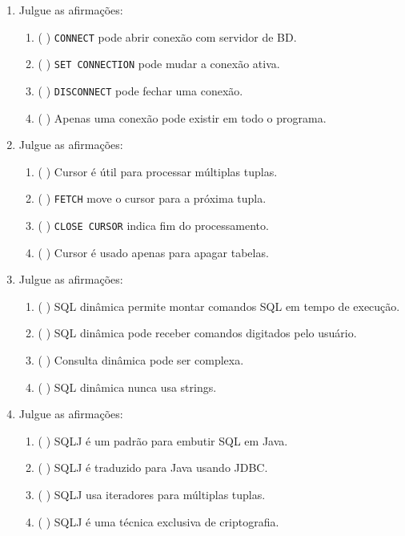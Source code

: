 \documentclass[12pt,a4paper]{article}
\begin{document}
\begin{enumerate}[resume,label=\textbf{Q\arabic*.}]
\item Julgue as afirmações:

\begin{enumerate}[label=\alph*)]
    \item ( \quad ) \texttt{CONNECT} pode abrir conexão com servidor de BD.
    \item ( \quad ) \texttt{SET CONNECTION} pode mudar a conexão ativa.
    \item ( \quad ) \texttt{DISCONNECT} pode fechar uma conexão.
    \item ( \quad ) Apenas uma conexão pode existir em todo o programa.
\end{enumerate}

\item Julgue as afirmações:

\begin{enumerate}[label=\alph*)]
    \item ( \quad ) Cursor é útil para processar múltiplas tuplas.
    \item ( \quad ) \texttt{FETCH} move o cursor para a próxima tupla.
    \item ( \quad ) \texttt{CLOSE CURSOR} indica fim do processamento.
    \item ( \quad ) Cursor é usado apenas para apagar tabelas.
\end{enumerate}

\item Julgue as afirmações:

\begin{enumerate}[label=\alph*)]
    \item ( \quad ) SQL dinâmica permite montar comandos SQL em tempo de execução.
    \item ( \quad ) SQL dinâmica pode receber comandos digitados pelo usuário.
    \item ( \quad ) Consulta dinâmica pode ser complexa.
    \item ( \quad ) SQL dinâmica nunca usa strings.
\end{enumerate}

\item Julgue as afirmações:

\begin{enumerate}[label=\alph*)]
    \item ( \quad ) SQLJ é um padrão para embutir SQL em Java.
    \item ( \quad ) SQLJ é traduzido para Java usando JDBC.
    \item ( \quad ) SQLJ usa iteradores para múltiplas tuplas.
    \item ( \quad ) SQLJ é uma técnica exclusiva de criptografia.
\end{enumerate}


\end{enumerate}
\end{document}
